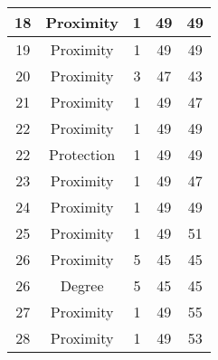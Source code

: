 \documentclass[results.tex]{subfiles}
\begin{document}
\begin{center}
\begin{tabular}{| c || c | c | c | c |}
            \hline
            18                      & Proximity                    & 1                      & 49                      & 49                   \\
            \hline
            19                      & Proximity                    & 1                      & 49                      & 49                   \\
            \hline
            20                      & Proximity                    & 3                      & 47                      & 43                   \\
            \hline
            21                      & Proximity                    & 1                      & 49                      & 47                   \\
            \hline
            22                      & Proximity                    & 1                      & 49                      & 49                   \\
            \hline
            22                      & Protection                   & 1                      & 49                      & 49                   \\
            \hline
            23                      & Proximity                    & 1                      & 49                      & 47                   \\
            \hline
            24                      & Proximity                    & 1                      & 49                      & 49                   \\
            \hline
            25                      & Proximity                    & 1                      & 49                      & 51                   \\
            \hline
            26                      & Proximity                    & 5                      & 45                      & 45                   \\
            \hline
            26                      & Degree                       & 5                      & 45                      & 45                   \\
            \hline
            27                      & Proximity                    & 1                      & 49                      & 55                   \\
            \hline
            28                      & Proximity                    & 1                      & 49                      & 53                   \\

\end{tabular}
\end{center}
\end{document}
